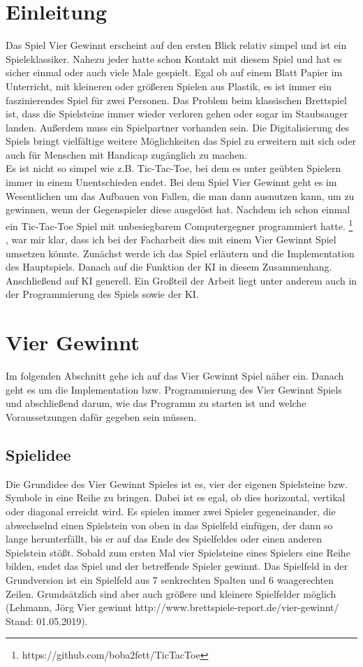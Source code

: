 \documentclass[12pt,a4paper]{article}
\begin{document}
	\section{Einleitung}
	Das Spiel Vier Gewinnt erscheint auf den ersten Blick relativ simpel und ist ein Spieleklassiker. Nahezu jeder hatte schon Kontakt mit diesem Spiel und hat es sicher einmal oder auch viele Male gespielt. Egal ob auf einem Blatt Papier im Unterricht, mit kleineren oder größeren Spielen aus Plastik, es ist immer ein faszinierendes Spiel für zwei Personen. Das Problem beim klassischen Brettspiel ist, dass die Spielsteine immer wieder verloren gehen oder sogar im Staubsauger landen. Außerdem muss ein Spielpartner vorhanden sein. Die Digitalisierung des Spiels bringt vielfältige weitere Möglichkeiten das Spiel zu erweitern mit sich oder auch für Menschen mit Handicap zugänglich zu machen.\\ Es ist nicht so simpel wie z.B. Tic-Tac-Toe, bei dem es unter geübten Spielern immer in einem Unentschieden endet. Bei dem Spiel Vier Gewinnt geht es im Wesentlichen um das Aufbauen von Fallen, die man dann ausnutzen kann, um zu gewinnen, wenn der Gegenspieler diese ausgelöst hat. Nachdem ich schon einmal ein Tic-Tac-Toe Spiel mit unbesiegbarem Computergegner programmiert hatte.
	\footnote{https://github.com/boba2fett/TicTacToe}
	, war mir klar, dass ich bei der Facharbeit dies mit einem  Vier Gewinnt Spiel umsetzen könnte. Zunächst werde ich das Spiel erläutern und die Implementation des Hauptspiels. Danach auf die Funktion der KI in diesem Zusammenhang. Anschließend auf KI generell. Ein Großteil der Arbeit liegt unter anderem auch in der Programmierung des Spiels sowie der KI.
	\section{Vier Gewinnt}
	Im folgenden Abschnitt gehe ich auf das Vier Gewinnt Spiel näher ein. Danach geht es um die Implementation bzw. Programmierung des Vier Gewinnt Spiels und abschließend darum, wie das Programm zu starten ist und welche Voraussetzungen dafür gegeben sein müssen.
	\subsection{Spielidee}
	Die Grundidee des Vier Gewinnt Spieles ist es, vier der eigenen Spielsteine bzw. Symbole in eine Reihe zu bringen.
	Dabei ist es egal, ob dies horizontal, vertikal oder diagonal erreicht wird.
	Es spielen immer zwei Spieler gegeneinander, die abwechselnd einen Spielstein von oben in das Spielfeld einfügen, der dann so lange herunterfällt, bis er auf das Ende des Spielfeldes oder einen anderen Spielstein stößt.
	Sobald zum ersten Mal vier Spielsteine eines Spielers eine Reihe bilden, endet das Spiel und der betreffende Spieler gewinnt.
	Das Spielfeld in der Grundversion ist ein Spielfeld aus 7 senkrechten Spalten und 6 waagerechten Zeilen. Grundsätzlich sind aber auch größere und kleinere Spielfelder möglich 
	(Lehmann, Jörg \glqq Vier gewinnt\grqq{} http://www.brettspiele-report.de/vier-gewinnt/ Stand: 01.05.2019).
\end{document}
